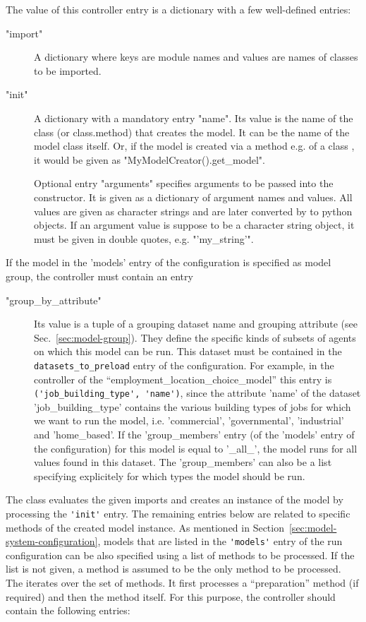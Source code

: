 The value of this controller entry is a dictionary with a few well-defined entries:
\begin{description}
\item["import"] A dictionary where keys are module names and values are names
  of classes to be imported.
\item["init"] A dictionary with a mandatory entry "name". Its value is the
  name of the class (or class.method) that creates the model. It can be the
  name of the model class itself.  Or, if the model is created via   a
  method e.g.  of a class , it would be
  given as "MyModelCreator().get_model".

  Optional entry "arguments" specifies arguments to be passed into the
  constructor. It is given as a dictionary of argument names and values. All
  values are given as character strings and are later converted by
   to python \pythonindex objects. If an argument value is suppose to be
  a character string object, it must be given in double quotes, e.g.
  "'my_string'".
\end{description}
If the model in the 'models' entry of the configuration is specified as model group, the controller must contain 
an entry
\begin{description}
\item["group_by_attribute"] Its value is a tuple of a grouping dataset name and grouping attribute (see Sec.~\ref{sec:model-group}).
They define the specific kinds of 
subsets of agents on which this model can be run. This dataset must be contained in the 
\verb|datasets_to_preload| entry of the configuration. For example, in the controller of the 
``employment_location_choice_model'' this entry is
\verb|('job_building_type', 'name')|, since the attribute 'name' of the dataset 'job_building_type' contains the various
building types of jobs for which we want to run the model, i.e. 'commercial', 'governmental', 'industrial' and 'home_based'.
If the 'group_members' entry (of the 'models' entry of the configuration) for this model is equal to '_all_', the model runs 
for all values found in this dataset. The  'group_members' can also be a list specifying explicitely for which types the model 
should be run. 
\end{description}

The  class evaluates the given imports and creates an
instance of the model by processing the \verb|'init'| entry. The remaining entries
below are related to specific methods of the created model instance.  As
mentioned in Section~\ref{sec:model-system-configuration}, models \modelsindex
that are listed in the \verb|'models'| entry of the run configuration can be also
specified using a list of methods to be processed. If the list is not given, a
method  is assumed to be the only method to be processed. The
 iterates over the set of methods. It first processes a
``preparation'' method (if required) and then the method itself. For this purpose,
the controller should contain the following entries:

